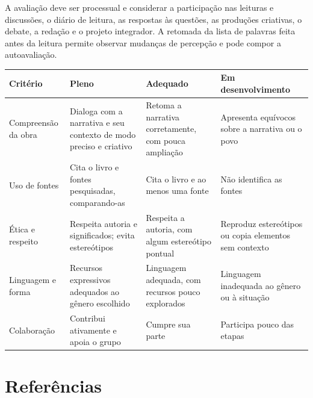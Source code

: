 \vspace*{-4\baselineskip}

A avaliação deve ser processual e considerar a participação nas leituras
e discussões, o diário de leitura, as respostas às questões, as
produções criativas, o debate, a redação e o projeto integrador. A
retomada da lista de palavras feita antes da leitura permite observar
mudanças de percepção e pode compor a autoavaliação.


\begingroup\small
\noindent\begin{tabular}{p{.22\linewidth}p{.23\linewidth}p{.23\linewidth}p{.2\linewidth}}
\textbf{Critério} & \textbf{Pleno} & \textbf{Adequado} & \textbf{Em
desenvolvimento}\\
\hline
Compreensão da obra & Dialoga com a narrativa e seu contexto de modo
preciso e criativo & Retoma a narrativa corretamente, com pouca
ampliação & Apresenta equívocos sobre a narrativa ou o povo\\
\hline
Uso de fontes & Cita o livro e fontes pesquisadas, comparando-as &
Cita o livro e ao menos uma fonte & Não identifica as fontes\\
\hline
Ética e respeito & Respeita autoria e significados; evita estereótipos
& Respeita a autoria, com algum estereótipo pontual & Reproduz
estereótipos ou copia elementos sem contexto\\
\hline
Linguagem e forma & Recursos expressivos adequados ao gênero escolhido
& Linguagem adequada, com recursos pouco explorados & Linguagem
inadequada ao gênero ou à situação\\
\hline
Colaboração & Contribui ativamente e apoia o grupo & Cumpre sua parte
& Participa pouco das etapas\\
\end{tabular}
\endgroup

\chapter{Referências}

